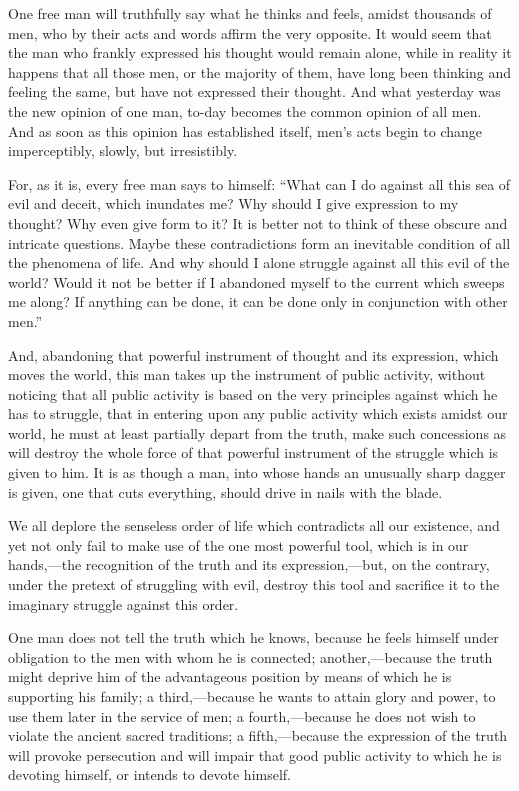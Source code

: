 \documentclass{book}
\begin{document}
One free man will truthfully say what he thinks and feels, amidst thousands of men, who by their acts and words affirm the very opposite. It would seem that the man who frankly expressed his thought would remain alone, while in reality it happens that all those men, or the majority of them, have long been thinking and feeling the same, but have not expressed their thought. And what yesterday was the new opinion of one man, to-day becomes the common opinion of all men. And as soon as this opinion has established itself, men’s acts begin to change imperceptibly, slowly, but irresistibly.

For, as it is, every free man says to himself: “What can I do against all this sea of evil and deceit, which inundates me? Why should I give expression to my thought? Why even give form to it? It is better not to think of these obscure and intricate questions. Maybe these contradictions form an inevitable condition of all the phenomena of life. And why should I alone struggle against all this evil of the world? Would it not be better if I abandoned myself to the current which sweeps me along? If anything can be done, it can be done only in conjunction with other men.”

And, abandoning that powerful instrument of thought and its expression, which moves the world, this man takes up the instrument of public activity, without noticing that all public activity is based on the very principles against which he has to struggle, that in entering upon any public activity which exists amidst our world, he must at least partially depart from the truth, make such concessions as will destroy the whole force of that powerful instrument of the struggle which is given to him. It is as though a man, into whose hands an unusually sharp dagger is given, one that cuts everything, should drive in nails with the blade.

We all deplore the senseless order of life which contradicts all our existence, and yet not only fail to make use of the one most powerful tool, which is in our hands,—the recognition of the truth and its expression,—but, on the contrary, under the pretext of struggling with evil, destroy this tool and sacrifice it to the imaginary struggle against this order.

One man does not tell the truth which he knows, because he feels himself under obligation to the men with whom he is connected; another,—because the truth might deprive him of the advantageous position by means of which he is supporting his family; a third,—because he wants to attain glory and power, to use them later in the service of men; a fourth,—because he does not wish to violate the ancient sacred traditions; a fifth,—because the expression of the truth will provoke persecution and will impair that good public activity to which he is devoting himself, or intends to devote himself.
\end{document}
